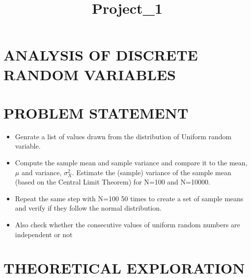 \documentclass[11pt]{article}
\title{Project\_1}
\providecommand{\tightlist}{%
      \setlength{\itemsep}{0pt}\setlength{\parskip}{0pt}}
\begin{document}
    
    
    \maketitle
    
    

    
    \section{ANALYSIS OF DISCRETE RANDOM
VARIABLES}\label{analysis-of-discrete-random-variables}

\section{PROBLEM STATEMENT}\label{problem-statement}

\begin{itemize}
\tightlist
\item
  Genrate a list of values drawn from the distribution of Uniform random
  variable.
\item
  Compute the sample mean and sample variance and compare it to the
  mean, \(\mu\) and variance, \(\sigma_X^2\). Estimate the (sample)
  variance of the sample mean (based on the Central Limit Theorem) for
  N=100 and N=10000.
\item
  Repeat the same step with N=100 50 times to create a set of sample
  means and verify if they follow the normal distribution.
\item
  Also check whether the consecutive values of uniform random numbers
  are independent or not
\end{itemize}

    \section{THEORETICAL EXPLORATION}\label{theoretical-exploration}
\end{document}
